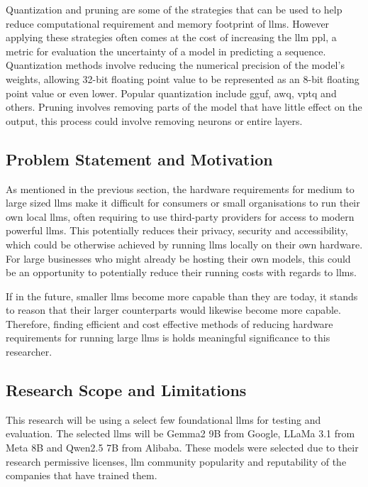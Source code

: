 \documentclass{ifacconf}
\begin{document}
	Quantization and pruning are some of the strategies that can be used to help reduce computational requirement and memory footprint of \glspl{llm}. However applying these strategies often comes at the cost of increasing the \gls{llm} \gls{ppl}, a metric for evaluation the uncertainty of a model in predicting a sequence. Quantization methods involve reducing the numerical precision of the model's weights, allowing 32-bit floating point value to be represented as an 8-bit floating point value or even lower. Popular quantization include \gls{gguf}\cite{llamacpp, ggml}, \gls{awq}\cite{lin2024awqactivationawareweightquantization}, \gls{vptq}\cite{liu2024vptqextremelowbitvector} and others. Pruning involves removing parts of the model that have little effect on the output, this process could involve removing neurons or entire layers.
	
	\subsection{Problem Statement and Motivation}
	
	As mentioned in the previous section, the hardware requirements for medium to large sized  \glspl{llm} make it difficult for consumers or small organisations to run their own local  \glspl{llm}, often requiring to use third-party providers for access to modern powerful  \glspl{llm}. This potentially reduces their privacy, security and accessibility, which could be otherwise achieved by running  \glspl{llm} locally on their own hardware. For large businesses who might already be hosting their own models, this could be an opportunity to potentially reduce their running costs with regards to \glspl{llm}.
	
	If in the future, smaller \glspl{llm} become more capable than they are today, it stands to reason that their larger counterparts would likewise become more capable. Therefore, finding efficient and cost effective methods of reducing hardware requirements for running large \glspl{llm} is holds meaningful significance to this researcher.
	
	\subsection{Research Scope and Limitations}
	This research will be using a select few foundational \glspl{llm} for testing and evaluation. The selected \glspl{llm} will be Gemma2 9B from Google\cite{gemmateam2024gemma2improvingopen}, LLaMa 3.1 from Meta 8B \cite{dubey2024llama3herdmodels} and Qwen2.5 7B from Alibaba\cite{qwen2.5}. These models were selected due to their research permissive licenses, \gls{llm} community popularity and reputability of the companies that have trained them.
	
\end{document}
